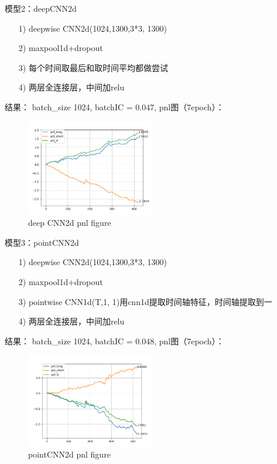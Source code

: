 \documentclass[11pt]{ctexart}
\begin{document}
模型2：deepCNN2d
\begin{itemize}
  \item [1)]
  deepwise CNN2d(1024,1300,3*3, 1300)
  \item [2)]
  maxpool1d+dropout
  \item [3)]
  每个时间取最后和取时间平均都做尝试
  \item [4)]
  两层全连接层，中间加relu

\end{itemize}
结果： batch\_size 1024, batchIC = 0.047,
pnl图（7epoch）：
\begin{figure}[!ht]
\begin{center}
\includegraphics[width=0.5\textwidth]{5.PNG}
\end{center}
\caption{deep CNN2d pnl figure}
\label{FIG.2}
\end{figure}

模型3：pointCNN2d
\begin{itemize}
  \item [1)]
  deepwise CNN2d(1024,1300,3*3, 1300)
  \item [2)]
  maxpool1d+dropout
  \item [3)]
  pointwise CNN1d(T,1, 1)用cnn1d提取时间轴特征，时间轴提取到一
  \item [4)]
  两层全连接层，中间加relu

\end{itemize}
结果： batch\_size 1024, batchIC = 0.048,
pnl图（7epoch）：
\begin{figure}[!ht]
\begin{center}
\includegraphics[width=0.5\textwidth]{1.PNG}
\end{center}
\caption{pointCNN2d pnl figure}
\label{FIG.3}
\end{figure}
\end{document}
